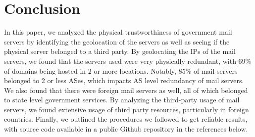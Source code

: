 \documentclass{hotnets21}
\begin{document}
\section{Conclusion}

In this paper, we analyzed the physical trustworthiness of government mail servers by identifying the geolocation of the servers as well as seeing if the physical server belonged to a third party.
By geolocating the IPs of the mail servers, we found that the servers used were very physically redundant, with 69\% of domains being hosted in 2 or more locations.
Notably, 85\% of mail servers belonged to 2 or less ASes, which impacts AS level redundancy of mail servers.
We also found that there were foreign mail servers as well, all of which belonged to state level government services.
By analyzing the third-party usage of mail servers, we found extensive usage of third party resources, particularly in foreign countries.
Finally, we outlined the procedures we followed to get reliable results, with source code available in a public Github repository in the references below.

 
\begin{small}

\end{small}
\end{document}
